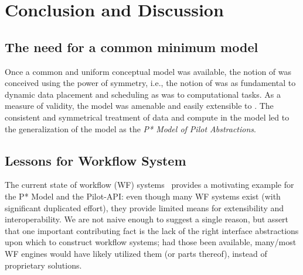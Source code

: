 \documentclass{sig-alternate}
\begin{document}
% 


\section{Conclusion and Discussion}

\subsection{The need for a common minimum model}


Once a common and uniform conceptual model was available, the notion
of \pilotdata was conceived using the power of symmetry, i.e., the
notion of \pilotdata was as fundamental to dynamic data placement and
scheduling as \pilotjobs was to computational tasks. As a measure of
validity, the \pstar model was amenable and easily extensible to
\pilotdata.  The consistent and symmetrical treatment of data and
compute in the model led to the generalization of the model as the
{\it P* Model of Pilot Abstractions}.


\subsection{Lessons for Workflow System}

The current state of workflow (WF) systems~\cite{nsf-workflow,1196459}
provides a motivating example for the P* Model and the Pilot-API: even
though many WF systems exist (with significant duplicated effort),
they provide limited means for extensibility and interoperability.  We
are not naive enough to suggest a single reason, but assert that one
important contributing fact is the lack of the right interface
abstractions upon which to construct workflow systems; had those been
available, many/most WF engines would have likely utilized them (or
parts thereof), instead of proprietary solutions.
\end{document}
